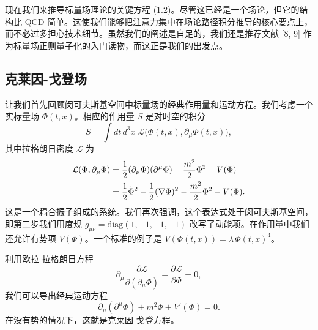 现在我们来推导标量场理论的关键方程 (1.2)。尽管这已经是一个场论，但它的结构比 QCD 简单。这使我们能够把注意力集中在场论路径积分推导的核心要点上，而不必过多担心技术细节。虽然我们的阐述是自足的，我们还是推荐文献 [8, 9] 作为标量场正则量子化的入门读物，而这正是我们的出发点。

\subsection{克莱因-戈登场}

让我们首先回顾闵可夫斯基空间中标量场的经典作用量和运动方程。我们考虑一个实标量场 $\Phi(t,x)$。相应的作用量 $S$ 是对时空的积分
\begin{equation}
  S = \int dt\,d^3x\;\mathcal{L}\big(\Phi(t,x), \partial_\mu\Phi(t,x)\big),
\end{equation}
其中拉格朗日密度 $\mathcal{L}$ 为
\begin{align}
  \mathcal{L}(\Phi, \partial_\mu\Phi)
  &= \frac{1}{2}(\partial_\mu\Phi)(\partial^\mu\Phi) - \frac{m^2}{2}\Phi^2 - V(\Phi) \notag\\
  &= \frac{1}{2}\dot{\Phi}^2 - \frac{1}{2}(\nabla\Phi)^2 - \frac{m^2}{2}\Phi^2 - V(\Phi).
\end{align}
这是一个耦合振子组成的系统。我们再次强调，这个表达式处于闵可夫斯基空间，即第二步我们用度规 $g_{\mu\nu} = \mathrm{diag}(1,-1,-1,-1)$ 改写了动能项。在作用量中我们还允许有势项 $V(\Phi)$。一个标准的例子是 $V(\Phi(t,x)) = \lambda\,\Phi(t,x)^4$。

利用欧拉-拉格朗日方程
\begin{equation}
  \partial_\mu\frac{\partial\mathcal{L}}{\partial(\partial_\mu\Phi)}
  - \frac{\partial\mathcal{L}}{\partial\Phi} = 0,
\end{equation}
我们可以导出经典运动方程
\begin{equation}
  \partial_\mu(\partial^\mu\Phi) + m^2\Phi + V'(\Phi) = 0.
\end{equation}
在没有势的情况下，这就是克莱因-戈登方程。

